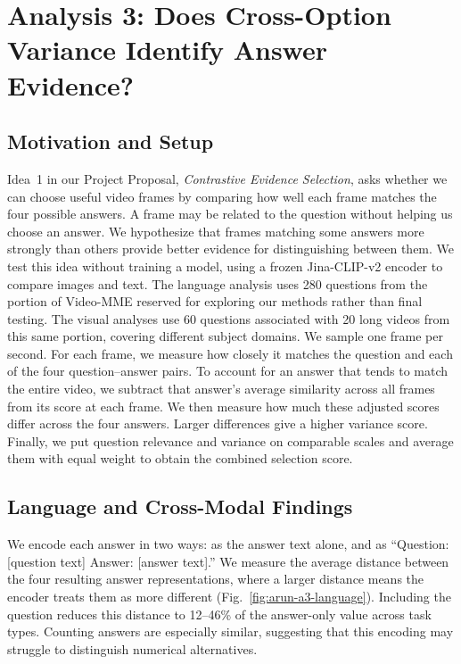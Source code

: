\section{Analysis 3: Does Cross-Option Variance Identify Answer Evidence?}
\label{sec:arun-analysis3}

\subsection{Motivation and Setup}
Idea~1 in our Project Proposal, \emph{Contrastive Evidence Selection}, asks whether we can choose useful video frames by comparing how well each frame matches the four possible answers. A frame may be related to the question without helping us choose an answer. We hypothesize that frames matching some answers more strongly than others provide better evidence for distinguishing between them. We test this idea without training a model, using a frozen Jina-CLIP-v2 encoder to compare images and text. The language analysis uses 280 questions from the portion of Video-MME reserved for exploring our methods rather than final testing. The visual analyses use 60 questions associated with 20 long videos from this same portion, covering different subject domains. We sample one frame per second. For each frame, we measure how closely it matches the question and each of the four question--answer pairs. To account for an answer that tends to match the entire video, we subtract that answer's average similarity across all frames from its score at each frame. We then measure how much these adjusted scores differ across the four answers. Larger differences give a higher variance score. Finally, we put question relevance and variance on comparable scales and average them with equal weight to obtain the combined selection score.

\subsection{Language and Cross-Modal Findings}
We encode each answer in two ways: as the answer text alone, and as ``Question: [question text] Answer: [answer text].'' We measure the average distance between the four resulting answer representations, where a larger distance means the encoder treats them as more different (Fig.~\ref{fig:arun-a3-language}). Including the question reduces this distance to 12--46\% of the answer-only value across task types. Counting answers are especially similar, suggesting that this encoding may struggle to distinguish numerical alternatives.

